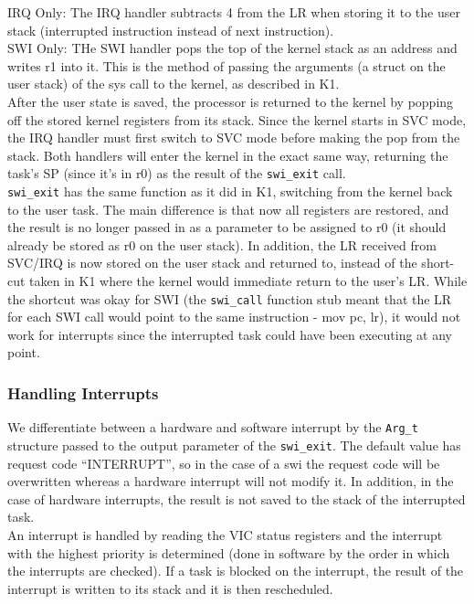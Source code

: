\documentclass[12pt]{article}
\begin{document}
IRQ Only: The IRQ handler subtracts 4 from the LR when storing it to the user stack (interrupted instruction instead of next instruction).
\\
SWI Only: THe SWI handler pops the top of the kernel stack as an address and writes r1 into it. This is the method of passing the arguments (a struct on the user stack) of the sys call to the kernel, as described in K1.
\\
After the user state is saved, the processor is returned to the kernel by popping off the stored kernel registers from its stack. Since the kernel starts in SVC mode, the IRQ handler must first switch to SVC mode before making the pop from the stack. Both handlers will enter the kernel in the exact same way, returning the task's SP (since it's in r0) as the result of the \texttt{swi\_exit} call.
\\
\texttt{swi\_exit} has the same function as it did in K1, switching from the kernel back to the user task. The main difference is that now all registers are restored, and the result is no longer passed in as a parameter to be assigned to r0 (it should already be stored as r0 on the user stack). In addition, the LR received from SVC/IRQ is now stored on the user stack and returned to, instead of the short-cut taken in K1 where the kernel would immediate return to the user's LR. While the shortcut was okay for SWI (the \texttt{swi\_call} function stub meant that the LR for each SWI call would point to the same instruction - mov pc, lr), it would not work for interrupts since the interrupted task could have been executing at any point.

\subsubsection{Handling Interrupts}
We differentiate between a hardware and software interrupt by the \texttt{Arg\_t} structure passed to the output parameter of the \texttt{swi\_exit}. The default value has request code ``INTERRUPT'', so in the case of a swi the request code will be overwritten whereas a hardware interrupt will not modify it. In addition, in the case of hardware interrupts, the result is not saved to the stack of the interrupted task.
\\
An interrupt is handled by reading the VIC status registers and the interrupt with the highest priority is determined (done in software by the order in which the interrupts are checked). If a task is blocked on the interrupt, the result of the interrupt is written to its stack and it is then rescheduled.
\\[1\baselineskip]
\end{document}
